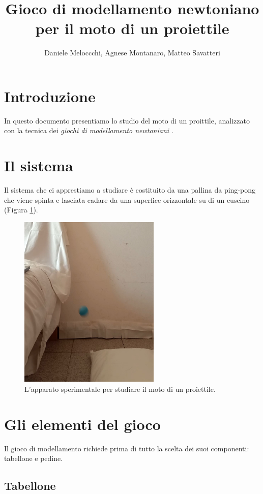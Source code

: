 \documentclass{article}
\title{Gioco di modellamento newtoniano per il moto di un proiettile}
\author{Daniele Meloccchi, Agnese Montanaro, Matteo Savatteri}
\begin{document}
\maketitle

\tableofcontents

\section{Introduzione}
In questo documento presentiamo lo studio del moto di un
proittile, analizzato con la tecnica dei \emph{giochi di modellamento newtoniani}
\cite{hestenes1992modeling}.

\section{Il sistema}
Il sistema che ci apprestiamo a studiare è costituito da una pallina da
ping-pong che viene spinta e lasciata cadare da una superfice orizzontale
su di un cuscino (Figura \ref{fig:setup_proiettile}).

\begin{figure}[H]
\centering
  \includegraphics[width=0.60\textwidth]{setup_proiettile}
  \caption{L'apparato sperimentale per studiare il moto di un proiettile.}
  \label{fig:setup_proiettile}
\end{figure}

\section{Gli elementi del gioco}
Il gioco di modellamento richiede prima di tutto la scelta
dei suoi componenti: tabellone e pedine.

\subsection{Tabellone} 

{}

\end{document}
